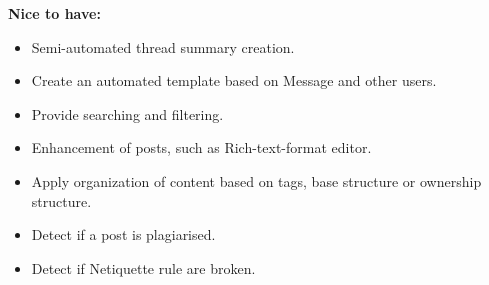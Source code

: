 \documentclass[12pt]{article}
\begin{document}
\newpage
\textbf{Nice to have:}
\begin{itemize}
\item Semi-automated thread summary creation.
\item Create an automated template based on Message and other users.
\item Provide searching and filtering.
\item Enhancement of posts, such as Rich-text-format editor.
\item Apply organization of content based on tags, base structure or ownership structure.
\item Detect if a post is plagiarised.
\item Detect if Netiquette rule are broken.
\end{itemize}

\newpage %
\end{document}
